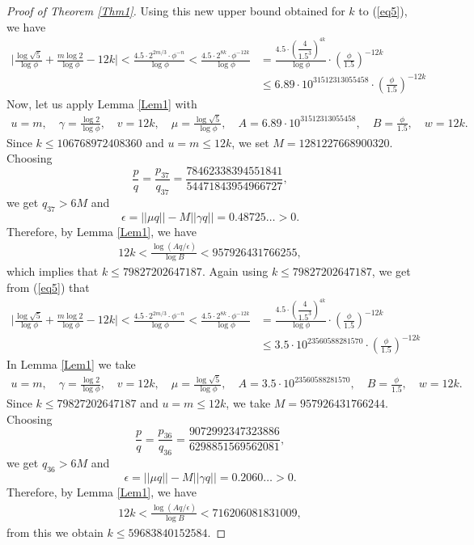 \documentclass[12pt,reqno]{amsart}
\begin{document}
\begin{proof}[Proof of Theorem \ref{Thm1}]
Using this new upper bound obtained for $k$ to (\ref{eq5}), we have
\begin{align*}
\bigg|\frac{\log\sqrt{5}}{\log\phi}+\frac{m\log2}{\log\phi}-12k\bigg|<\frac{4.5\cdot 2^{2m/3}\cdot\phi^{-n}}{\log\phi}<\frac{4.5\cdot 2^{8k}\cdot\phi^{-{12k}}}{\log\phi}&=\frac{4.5\cdot (\dfrac{4}{1.5^3})^{4k}}{\log\phi}\cdot (\frac{\phi}{1.5})^{-12k}\\
&\leq 6.89\cdot 10^{31512313055458}\cdot (\frac{\phi}{1.5})^{-12k} 
\end{align*}
Now, let us apply Lemma \ref{Lem1} with
\begin{align*}
    u=m,\quad \gamma=\frac{\log2}{\log \phi},\quad v=12k,\quad \mu=\frac{\log\sqrt{5}}{\log \phi},\quad A=6.89\cdot 10^{31512313055458},\quad B=\frac{\phi}{1.5},\quad w=12k.
\end{align*}
Since $k\leq  106768972408360$ and $u=m\leq 12k$, we set $M=1281227668900320$. Choosing  
$$\frac{p}{q}=\frac{p_{37}}{q_{37}}=\frac{78462338394551841}{54471843954966727},$$
we get $q_{37}>6M$ and
$$\epsilon=||\mu q||-M||\gamma q||=0.48725\ldots>0.$$
Therefore, by Lemma \ref{Lem1}, we have
\begin{align*}
    12k<\frac{\log(Aq/\epsilon)}{\log B}<957926431766255,
\end{align*}
which implies that $k\leq 79827202647187$. Again using $k\leq 79827202647187$, we get from (\ref{eq5}) that 
\begin{align*}
\bigg|\frac{\log\sqrt{5}}{\log\phi}+\frac{m\log2}{\log\phi}-12k\bigg|<\frac{4.5\cdot 2^{2m/3}\cdot\phi^{-n}}{\log\phi}<\frac{4.5\cdot 2^{8k}\cdot\phi^{-{12k}}}{\log\phi}&=\frac{4.5\cdot (\dfrac{4}{1.5^3})^{4k}}{\log\phi}\cdot (\frac{\phi}{1.5})^{-12k}\\
&\leq 3.5\cdot 10^{23560588281570}\cdot (\frac{\phi}{1.5})^{-12k} 
\end{align*}
In Lemma \ref{Lem1} we take
\begin{align*}
    u=m,\quad \gamma=\frac{\log2}{\log \phi},\quad v=12k,\quad \mu=\frac{\log\sqrt{5}}{\log \phi},\quad A=3.5\cdot 10^{23560588281570},\quad B=\frac{\phi}{1.5},\quad w=12k.
\end{align*}
Since $k\leq  79827202647187$ and $u=m\leq 12k$, we take $M=957926431766244$. Choosing  
$$\frac{p}{q}=\frac{p_{36}}{q_{36}}=\frac{9072992347323886}{6298851569562081},$$
we get $q_{36}>6M$ and
$$\epsilon=||\mu q||-M||\gamma q||=0.2060\ldots>0.$$
Therefore, by Lemma \ref{Lem1}, we have
\begin{align*}
    12k<\frac{\log(Aq/\epsilon)}{\log B}<716206081831009,
\end{align*}
from this we obtain $k\leq 59683840152584$. 



\end{proof}
\end{document}
